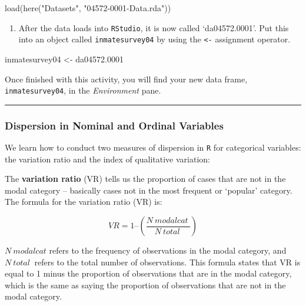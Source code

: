 \documentclass[
]{book}
\newenvironment{Shaded}{\begin{snugshade}}{\end{snugshade}}
\newcommand{\FloatTok}[1]{\textcolor[rgb]{0.00,0.00,0.81}{#1}}
\newcommand{\FunctionTok}[1]{\textcolor[rgb]{0.00,0.00,0.00}{#1}}
\newcommand{\NormalTok}[1]{#1}
\newcommand{\OtherTok}[1]{\textcolor[rgb]{0.56,0.35,0.01}{#1}}
\newcommand{\StringTok}[1]{\textcolor[rgb]{0.31,0.60,0.02}{#1}}
\providecommand{\tightlist}{%
  \setlength{\itemsep}{0pt}\setlength{\parskip}{0pt}}
\begin{document}
\begin{Shaded}
\begin{Highlighting}[]
\FunctionTok{load}\NormalTok{(}\FunctionTok{here}\NormalTok{(}\StringTok{"Datasets"}\NormalTok{, }\StringTok{"04572{-}0001{-}Data.rda"}\NormalTok{))}
\end{Highlighting}
\end{Shaded}

\begin{enumerate}
\def\labelenumi{\arabic{enumi}.}
\tightlist
\item
  After the data loads into \texttt{RStudio}, it is now called `da04572.0001'. Put this into an object called \texttt{inmatesurvey04} by using the \texttt{\textless{}-} assignment operator.
\end{enumerate}

\begin{Shaded}
\begin{Highlighting}[]
\NormalTok{inmatesurvey04 }\OtherTok{\textless{}{-}}\NormalTok{ da04572}\FloatTok{.0001}
\end{Highlighting}
\end{Shaded}

Once finished with this activity, you will find your new data frame, \texttt{inmatesurvey04}, in the \emph{Environment} pane.

\begin{center}\rule{0.5\linewidth}{0.5pt}\end{center}

\hypertarget{dispersion-in-nominal-and-ordinal-variables}{%
\subsubsection{\texorpdfstring{\textbf{Dispersion in Nominal and Ordinal Variables}}{Dispersion in Nominal and Ordinal Variables}}\label{dispersion-in-nominal-and-ordinal-variables}}

We learn how to conduct two measures of dispersion in \texttt{R} for categorical variables: the variation ratio and the index of qualitative variation:

The \textbf{variation ratio} (VR) tells us the proportion of cases that are not in the modal category -- basically cases not in the most frequent or `popular' category. The formula for the variation ratio (VR) is:

\[VR = 1 – ({\frac {N~modalcat~} {N~total~}})\]

\(N~modalcat\) refers to the frequency of observations in the modal category, and \(N~total~\) refers to the total number of observations. This formula states that VR is equal to 1 minus the proportion of observations that are in the modal category, which is the same as saying the proportion of observations that are not in the modal category.
\end{document}
